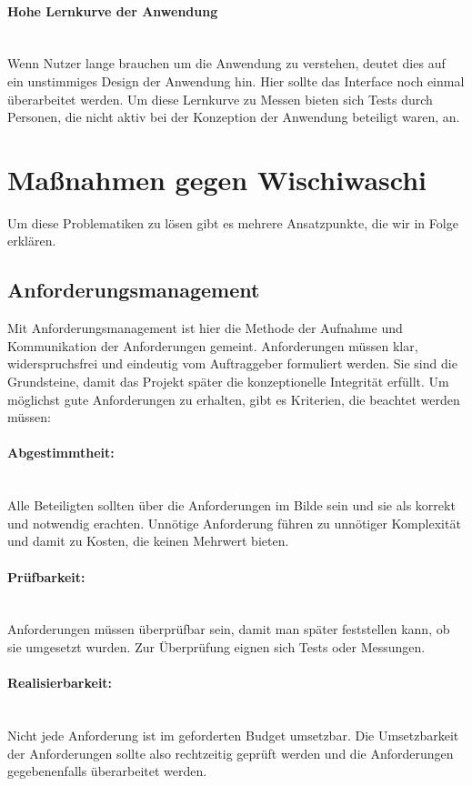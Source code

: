 \documentclass[a4paper, ngerman, 12pt, usenames, dvipsnames]{article}
\begin{document}
\paragraph{Hohe Lernkurve der Anwendung}\mbox{} \\
Wenn Nutzer lange brauchen um die Anwendung zu verstehen, deutet dies auf ein unstimmiges Design der Anwendung hin. Hier sollte das Interface noch einmal überarbeitet werden. Um diese Lernkurve zu Messen bieten sich Tests durch Personen, die nicht aktiv bei der Konzeption der Anwendung beteiligt waren, an. 

\pagebreak
\section{Maßnahmen gegen Wischiwaschi}
Um diese Problematiken zu lösen gibt es mehrere Ansatzpunkte, die wir in Folge erklären.
\subsection{Anforderungsmanagement}
Mit Anforderungsmanagement ist hier die Methode der Aufnahme und Kommunikation der Anforderungen gemeint.
Anforderungen müssen klar, widerspruchsfrei und eindeutig vom Auftraggeber formuliert werden. Sie sind die Grundsteine, damit das Projekt später die konzeptionelle Integrität erfüllt. Um möglichst gute Anforderungen zu erhalten, gibt es Kriterien, die beachtet werden müssen:

\paragraph{Abgestimmtheit:}\mbox{} \\
Alle Beteiligten sollten über die Anforderungen im Bilde sein und sie als korrekt und notwendig erachten. Unnötige Anforderung führen zu unnötiger Komplexität und damit zu Kosten, die keinen Mehrwert bieten.

\paragraph{Prüfbarkeit:}\mbox{} \\
Anforderungen müssen überprüfbar sein, damit man später feststellen kann, ob sie umgesetzt wurden. 
Zur Überprüfung eignen sich Tests oder Messungen.
\paragraph{Realisierbarkeit:}\mbox{} \\
Nicht jede Anforderung ist im geforderten Budget umsetzbar. Die Umsetzbarkeit der Anforderungen sollte also rechtzeitig geprüft werden und die Anforderungen gegebenenfalls überarbeitet werden.
\end{document}
